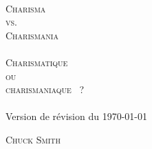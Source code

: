 
\pagestyle{empty}

\makeatletter
\begin{titlepage}
\begin{center}
\mbox{}
\vfill
\HRule \\[0.4cm]
\textsc{ \Huge %
    {Charisma\\ vs.\\[0.4cm] Charismania\\[0.4cm]\HRule\\[0.4cm]}{}
Charismatique\\ ou\\[0.4cm] \og charismaniaque \fg{}~?}\\[0.4cm]

\HRule \\[1.5cm]

%
   {\Large Version de r\'evision du \today}{}

\textsc{\Large Chuck Smith}\\[1.5cm]
\vfill
\mbox{}
\end{center}
\end{titlepage}
\makeatother


